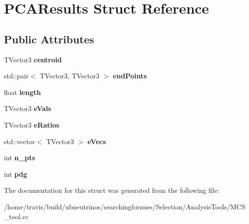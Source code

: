 \hypertarget{structPCAResults}{}\section{P\+C\+A\+Results Struct Reference}
\label{structPCAResults}
\subsection*{Public Attributes}
\begin{DoxyCompactItemize}
\item 
T\+Vector3 {\bfseries centroid}\hypertarget{structPCAResults_a75b22ba79061cee7d6e0046f71d3a8a3}{}\label{structPCAResults_a75b22ba79061cee7d6e0046f71d3a8a3}

\item 
std\+::pair$<$ T\+Vector3, T\+Vector3 $>$ {\bfseries end\+Points}\hypertarget{structPCAResults_a03f3fb6932c186b9d69f171723cda4cf}{}\label{structPCAResults_a03f3fb6932c186b9d69f171723cda4cf}

\item 
float {\bfseries length}\hypertarget{structPCAResults_a53992ffb41fc995e0132ff9bc647b104}{}\label{structPCAResults_a53992ffb41fc995e0132ff9bc647b104}

\item 
T\+Vector3 {\bfseries e\+Vals}\hypertarget{structPCAResults_ad138148de83f128b1b7f7c57b9e78c0f}{}\label{structPCAResults_ad138148de83f128b1b7f7c57b9e78c0f}

\item 
T\+Vector3 {\bfseries e\+Ratios}\hypertarget{structPCAResults_a7f4cf8cba26b2d48bc32fb68b13b4dea}{}\label{structPCAResults_a7f4cf8cba26b2d48bc32fb68b13b4dea}

\item 
std\+::vector$<$ T\+Vector3 $>$ {\bfseries e\+Vecs}\hypertarget{structPCAResults_aaec75cd3e66b002800f8f3ffba008266}{}\label{structPCAResults_aaec75cd3e66b002800f8f3ffba008266}

\item 
int {\bfseries n\+\_\+pts}\hypertarget{structPCAResults_a63831a31795de579b9af2ed478bd0a74}{}\label{structPCAResults_a63831a31795de579b9af2ed478bd0a74}

\item 
int {\bfseries pdg}\hypertarget{structPCAResults_a8e22075cb2eae7b4f08a6b5ef0ece027}{}\label{structPCAResults_a8e22075cb2eae7b4f08a6b5ef0ece027}

\end{DoxyCompactItemize}


The documentation for this struct was generated from the following file\+:\begin{DoxyCompactItemize}
\item 
/home/travis/build/ubneutrinos/searchingfornues/\+Selection/\+Analysis\+Tools/M\+C\+S\+\_\+tool.\+cc\end{DoxyCompactItemize}
